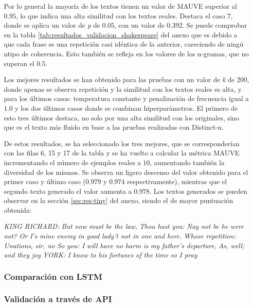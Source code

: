 \documentclass[11pt]{book}
\begin{document}
Por lo general la mayoría de los textos tienen un valor de MAUVE superior al $0.95$, lo que indica una alta similitud con los textos reales. Destaca el caso $7$, donde se aplica un valor de \textit{p} de $0.05$, con un valor de $0.392$. Se puede comprobar en la tabla \ref{tab:resultados_validacion_shakespeare} del anexo que es debido a que cada frase es una repetición casi idéntica de la anterior, careciendo de ningú ntipo de coherencia. Esto también se refleja en los valores de los n-gramas, que no superan el $0.5$. 

Los mejores resultados se han obtenido para las pruebas con un valor de \textit{k} de $200$, donde apenas se observa repetición y la similitud con los textos reales es alta, y para los últimos casos: temperatura constante y penalización de frecuencia igual a $1.0$ y los dos últimos casos donde se combinan hiperparámetros. El primero de esto tres últimos destaca, no solo por una alta similitud con los originales, sino que es el texto más fluido en base a las pruebas realizadas con Distinct-n. 

De estos resultados, se ha seleccionado los tres mejores, que se corresponderían con las filas 6, 15 y 17 de la tabla y se ha vuelto a calcular la métrica MAUVE incrementando el número de ejemplos reales a $10$, aumentando también la diversidad de los mismos. Se observa un ligero descenso del valor obtenido para el primer caso y último caso ($0.979$ y $0.974$ respectivamente), mientras que el segundo texto generado el valor aumenta a $0.978$. Los textos generados se pueden observar en la sección \ref{sec:res-tiny} del anexo, siendo el de mayor puntuación obtenida: 

\textit{KING RICHARD:}
\textit{But now must be the law,}
\textit{Thou hast you:}
\textit{Nay not be he were not?}
\textit{Or I's mine enemy in good lady't not in one and here.}
\textit{Whose repetition:}
\textit{Unations, sir, no}
\textit{So you: I will have no harm is my father's departure,}
\textit{As, well; and they joy}
\textit{YORK:}
\textit{I know to his fortunes of the time so I pray}


\subsubsection{Comparación con LSTM}


\subsubsection{Validación a través de API}
\end{document}
